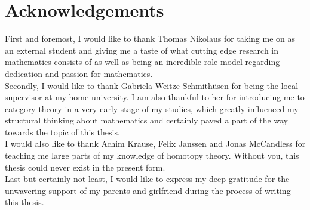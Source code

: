 \section*{Acknowledgements}
First and foremost, I would like to thank Thomas Nikolaus for taking me on as an external student and giving me a taste of what cutting edge research in mathematics consists of as well as being an incredible role model regarding dedication and passion for mathematics. \\
Secondly, I would like to thank Gabriela Weitze-Schmithüsen for being the local supervisor at my home university. I am also thankful to her for introducing me to category theory in a very early stage of my studies, which greatly influenced my structural thinking about mathematics and certainly paved a part of the way towards the topic of this thesis. \\
I would also like to thank Achim Krause, Felix Janssen and Jonas McCandless for teaching me large parts of my knowledge of homotopy theory. Without you, this thesis could never exist in the present form.
\\
\indent
Last but certainly not least, I would like to express my deep gratitude for the unwavering support of my parents and girlfriend during the process of writing this thesis.